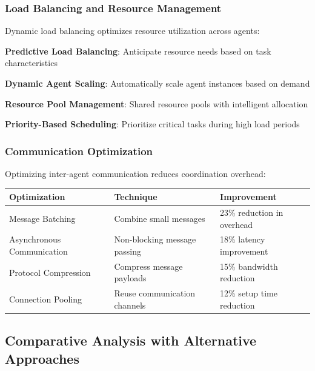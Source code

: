 \subsubsection*{Load Balancing and Resource Management}

Dynamic load balancing optimizes resource utilization across agents:

\begin{compactlist}
    \item \textbf{Predictive Load Balancing}: Anticipate resource needs based on task characteristics
    \item \textbf{Dynamic Agent Scaling}: Automatically scale agent instances based on demand
    \item \textbf{Resource Pool Management}: Shared resource pools with intelligent allocation
    \item \textbf{Priority-Based Scheduling}: Prioritize critical tasks during high load periods
\end{compactlist}

\subsubsection*{Communication Optimization}

Optimizing inter-agent communication reduces coordination overhead:

\begin{center}
\begin{tabular}{@{}lll@{}}
\toprule
\textbf{Optimization} & \textbf{Technique} & \textbf{Improvement} \\
\midrule
Message Batching & Combine small messages & 23\% reduction in overhead \\
Asynchronous Communication & Non-blocking message passing & 18\% latency improvement \\
Protocol Compression & Compress message payloads & 15\% bandwidth reduction \\
Connection Pooling & Reuse communication channels & 12\% setup time reduction \\
\bottomrule
\end{tabular}
\end{center}

\subsection*{Comparative Analysis with Alternative Approaches}

